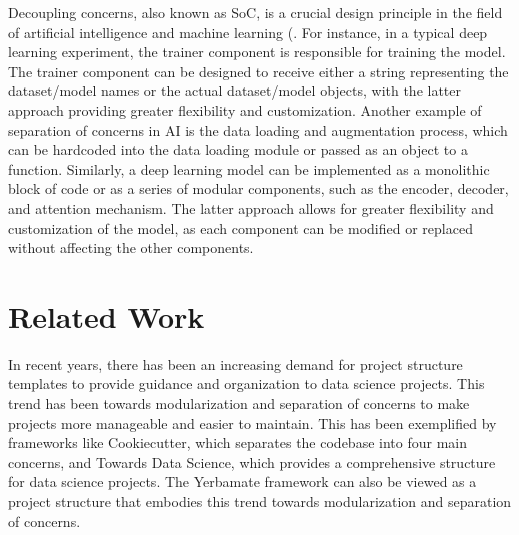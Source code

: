 Decoupling concerns, also known as SoC, is a crucial design principle in the field of artificial intelligence and machine learning (\cite{mo2016decoupling,qian2006decoupling, pressman2010software}. For instance, in a typical deep learning experiment, the trainer component is responsible for training the model. The trainer component can be designed to receive either a string representing the dataset/model names or the actual dataset/model objects, with the latter approach providing greater flexibility and customization. Another example of separation of concerns in AI is the data loading and augmentation process, which can be hardcoded into the data loading module or passed as an object to a function. Similarly, a deep learning model can be implemented as a monolithic block of code or as a series of modular components, such as the encoder, decoder, and attention mechanism. The latter approach allows for greater flexibility and customization of the model, as each component can be modified or replaced without affecting the other components.



\section{Related Work}

In recent years, there has been an increasing demand for project structure templates to provide guidance and organization to data science projects. This trend has been towards modularization and separation of concerns to make projects more manageable and easier to maintain. This has been exemplified by frameworks like Cookiecutter, which separates the codebase into four main concerns, and Towards Data Science, which provides a comprehensive structure for data science projects. The Yerbamate framework can also be viewed as a project structure that embodies this trend towards modularization and separation of concerns. 

